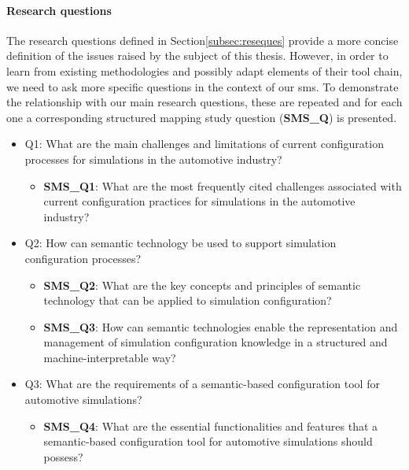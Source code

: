             \paragraph{Research questions\label{para:res-ques}}
            The research questions defined in Section\ref{subsec:reseques} provide a more concise definition of the issues raised by the subject of this thesis. However, in order to learn from existing methodologies and possibly adapt elements of their tool chain, we need to ask more specific questions in the context of our \acrshort{sms}. To demonstrate the relationship with our main research questions, these are repeated and for each one a corresponding structured mapping study question (\textbf{SMS\_Q}) is presented.

            \begin{itemize}
                \item Q1: What are the main challenges and limitations of current configuration processes for simulations in the automotive industry?
                    \begin{itemize}
                        \item \textbf{SMS\_Q1}: What are the most frequently cited challenges associated with current configuration practices for simulations in the automotive industry?
                    \end{itemize}


                \item Q2: How can semantic technology be used to support simulation configuration processes?
                    \begin{itemize}
                        \item \textbf{SMS\_Q2}: What are the key concepts and principles of semantic technology that can be applied to simulation configuration?

                        \item \textbf{SMS\_Q3}: How can semantic technologies enable the representation and management of simulation configuration knowledge in a structured and machine-interpretable way?
                    \end{itemize}
                    
                \item Q3: What are the requirements of a semantic-based configuration tool for automotive simulations?
                    \begin{itemize}
                        \item \textbf{SMS\_Q4}: What are the essential functionalities and features that a semantic-based configuration tool for automotive simulations should possess?
                    \end{itemize}



\end{itemize}
